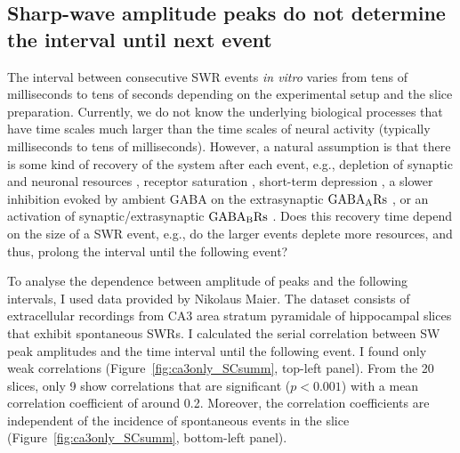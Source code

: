   \subsection{Sharp-wave amplitude peaks do not determine the interval until next event}
    \label{sec:swr_amp-int}
    The interval between consecutive SWR events \textit{in vitro} varies from
    tens of milliseconds to tens of seconds depending on the experimental setup
    and the slice preparation. Currently, we do not know the underlying
    biological processes that have time scales much larger than the time scales
    of neural activity (typically milliseconds to tens of milliseconds).
    However, a natural assumption is that there is some kind of recovery of the
    system after each event, e.g., depletion of synaptic and neuronal resources
    \citep{Cohen2004, Jones2007}, receptor saturation \citep{Trussell1993},
    short-term depression \citep{Romani2015, Kohus2016}, a slower inhibition
    evoked by ambient GABA on the extrasynaptic $\rm GABA_ARs$
    \citep{Brown1978, Ben1994}, or an activation of synaptic/extrasynaptic $\rm
    GABA_BRs$ \citep{Scanziani2000, Hollnagel2014, Lang2014}. Does this
    recovery time depend on the size of a SWR event, e.g., do the larger events
    deplete more resources, and thus, prolong the interval until the following
    event?

    To analyse the dependence between amplitude of peaks and the following
    intervals, I used data provided by Nikolaus Maier. The dataset consists of
    extracellular recordings from CA3 area stratum pyramidale of hippocampal
    slices that exhibit spontaneous SWRs. I calculated the serial correlation
    between SW peak amplitudes and the time interval until the following event.
    I found only weak correlations (Figure~\ref{fig:ca3only_SCsumm}, top-left
    panel). From the 20 slices, only 9 show correlations that are significant
    ($p<0.001$) with a mean correlation coefficient of around 0.2. Moreover,
    the correlation coefficients are independent of the incidence of
    spontaneous events in the slice (Figure~\ref{fig:ca3only_SCsumm},
    bottom-left panel).


